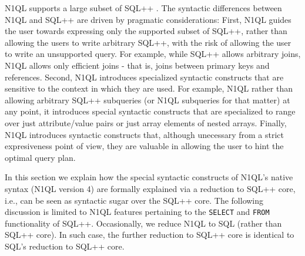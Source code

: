 

N1QL supports a large subset of SQL++ \cite{SQLpp-on-db.ucsd}. The syntactic differences between N1QL and SQL++ are driven by pragmatic considerations: First, N1QL guides the user towards expressing only the supported subset of SQL++, rather than allowing the users to write arbitrary SQL++, with the risk of allowing the user to write an unsupported query. For example, while SQL++ allows arbitrary joins, N1QL allows only efficient joins - that is, joins between primary keys and references. Second, N1QL introduces specialized syntactic constructs that are sensitive to the context in which they are used. For example, N1QL rather than allowing arbitrary SQL++ subqueries (or N1QL subqueries for that matter) at any point, it introduces special syntactic constructs that are specialized to range over just attribute/value pairs or just array elements of nested arrays. Finally, N1QL introduces syntactic constructs that, although unecessary from a strict expresiveness point of view, they are valuable in allowing the user to hint the optimal query plan.

In this section we explain how the special syntactic constructs of N1QL's native syntax (N1QL version 4) are formally explained via a reduction to SQL++ core, i.e., can be seen as syntactic sugar over the SQL++ core. The following discussion is limited to N1QL features pertaining to the \texttt{SELECT} and \texttt{FROM}
functionality of SQL++. Occasionally, we reduce N1QL to SQL (rather than SQL++ core). In such case, the further reduction to SQL++ core is identical to SQL's reduction to SQL++ core.


